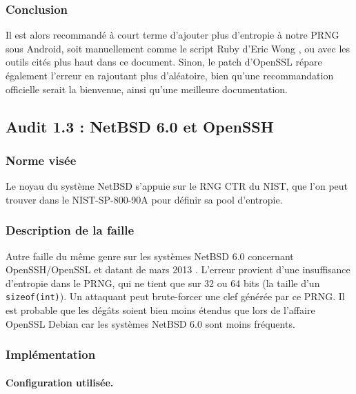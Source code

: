 		\subsubsection{Conclusion}		
		
			Il est alors recommandé à court terme d'ajouter plus d'entropie à notre PRNG sous Android, soit manuellement comme le script Ruby d'Eric Wong \cite{boblet2013android}, ou avec les outils cités plus haut dans ce document. Sinon, le patch d'OpenSSL \cite{alex2013android} répare également l'erreur en rajoutant plus d'aléatoire, bien qu'une recommandation officielle serait la bienvenue, ainsi qu'une meilleure documentation.\\

			
	\subsection{Audit 1.3 : NetBSD 6.0 et OpenSSH}
		\subsubsection{Norme visée}
		
			Le noyau du système NetBSD s'appuie sur le RNG CTR du NIST, que l'on peut trouver dans le NIST-SP-800-90A \cite{nist800-90A} pour définir sa pool d'entropie.	
		
		\subsubsection{Description de la faille}
		
			Autre faille du même genre sur les systèmes NetBSD 6.0 concernant OpenSSH/OpenSSL et datant de mars 2013 \cite{alerteBSD2013} \cite{failleNetBSDPatrick}. L'erreur provient d'une insuffisance d'entropie dans le PRNG, qui ne tient que sur 32 ou 64 bits (la taille d'un \texttt{sizeof(int)}). Un attaquant peut brute-forcer une clef générée par ce PRNG. Il est probable que les dégâts soient bien moins étendus que lors de l'affaire OpenSSL Debian car les systèmes NetBSD 6.0 sont moins fréquents.\\
			
		\subsubsection{Implémentation}
			
			\paragraph{Configuration utilisée.\\} 
			
